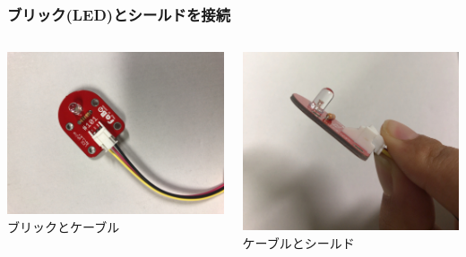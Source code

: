 \begin{frame}
    \frametitle{ブリック(LED)とシールドを接続} 
    \begin{columns}
        \begin{column}{0.48\textwidth}
            \includegraphics[width=\textwidth]{images/chap05/text05-img008.jpg} 
            {ブリックとケーブル}
        \end{column}
        \begin{column}{0.48\textwidth}
            \includegraphics[width=\textwidth]{images/chap05/text05-img011.jpg} 
            {ケーブルとシールド}
        \end{column}
    \end{columns}
\end{frame}

